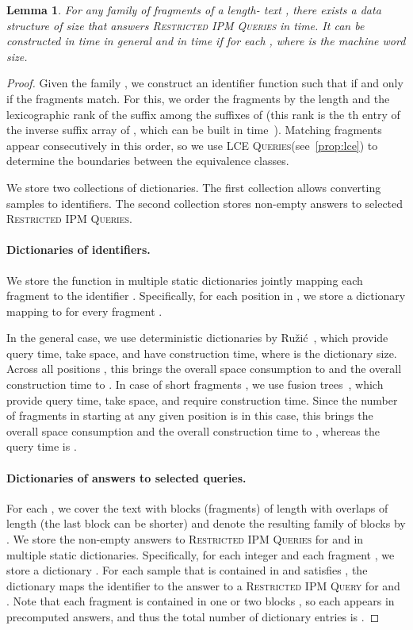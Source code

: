 \documentclass[a4paper]{article}
\newtheorem{lemma}[theorem]{Lemma}
\theoremstyle{definition}
\theoremstyle{remark}
\newcommand{\RIPM}{\textsc{Restricted IPM Queries}\xspace}
\newcommand{\RIPMOne}{\textsc{Restricted IPM Query}\xspace}
\newcommand{\LCEQ}{\textsc{LCE Queries}\xspace}
\begin{document}
\begin{lemma}\label{lem:locator}
For any family  of fragments of a length- text , there exists a data structure of size 
that answers \RIPM in  time. It can be constructed in  time
in general and in  time if  for each , where  is the machine word size.
\end{lemma}
\begin{proof}
Given the family , we construct an identifier function  such that  if and only if the fragments  match.
For this, we order the fragments  by the length  and the lexicographic rank of the suffix  among the suffixes of  (this rank is the th entry of the inverse suffix array of , which can be built in  time~\cite{DBLP:journals/jacm/KarkkainenSB06}).
Matching fragments  appear consecutively in this order, so we use \LCEQ (see~\cref{prop:lce}) to determine the boundaries between the equivalence classes.

We store two collections of dictionaries.
The first collection allows converting samples to identifiers.
The second collection stores non-empty answers to selected \RIPM.

\paragraph{Dictionaries of identifiers.}
We store the  function in multiple static dictionaries jointly mapping each fragment   to the identifier .
Specifically, for each position  in , we store a dictionary  mapping  to 
for every fragment . 

In the general case, we use deterministic dictionaries by Ružić~\cite{DBLP:conf/icalp/Ruzic08},
which provide  query time, take  space, and have 
construction time, where  is the dictionary size. 
Across all positions , this brings the overall space consumption to  and the overall construction time to .
In case of short fragments , we use fusion trees~\cite{DBLP:conf/focs/PatrascuT14},
which provide  query time, take  space, and require 
construction time. Since the number of fragments in 
starting at any given position  is  in this case, this brings the overall space consumption and
the overall construction time to , whereas the query time is .

\paragraph{Dictionaries of answers to selected queries.}
For each , we cover the text  with blocks (fragments) of length  with overlaps of length  (the last block can be shorter)
and denote the resulting family of blocks by .
We store the non-empty answers to \RIPM for  and  in multiple static dictionaries.
Specifically, for each integer  and each fragment ,
we store a dictionary .
For each sample  that is contained in  and satisfies ,
the dictionary  maps the identifier  to the answer to a \RIPMOne for  and .
Note that each fragment  is contained in one or two blocks , 
so each  appears in  precomputed answers, and thus the total number of dictionary entries is .


\end{proof}
\end{document}
